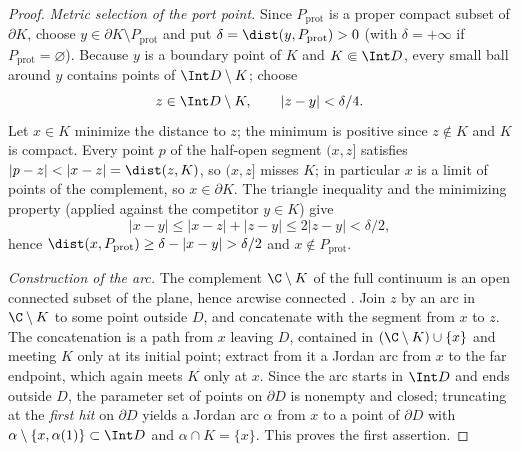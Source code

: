 \begin{proof}
\emph{Metric selection of the port point.}
Since $P_{\mathrm{prot}}$ is a proper compact subset of $\partial K$,
choose $y\in\partial K\setminus P_{\mathrm{prot}}$ and put
$\delta=\dist(y,P_{\mathrm{prot}})>0$ (with $\delta=+\infty$ if
$P_{\mathrm{prot}}=\varnothing$).  Because $y$ is a boundary point of $K$
and $K\Subset\Int D$, every small ball around $y$ contains points of
$\Int D\setminus K$; choose
\[
z\in\Int D\setminus K,\qquad |z-y|<\delta/4 .
\]
Let $x\in K$ minimize the distance to $z$; the minimum is positive since
$z\notin K$ and $K$ is compact.  Every point $p$ of the half-open segment
$(x,z]$ satisfies $|p-z|<|x-z|=\dist(z,K)$, so $(x,z]$ misses $K$; in
particular $x$ is a limit of points of the complement, so
$x\in\partial K$.  The triangle inequality and the minimizing property
(applied against the competitor $y\in K$) give
\[
|x-y|\le|x-z|+|z-y|\le 2|z-y|<\delta/2 ,
\]
hence
$\dist(x,P_{\mathrm{prot}})\ge\delta-|x-y|>\delta/2$ and
$x\notin P_{\mathrm{prot}}$.

\emph{Construction of the arc.}
The complement $\C\setminus K$ of the full continuum is an open connected
subset of the plane, hence arcwise connected \cite{New51}.  Join $z$ by
an arc in $\C\setminus K$ to some point outside $D$, and concatenate
with the segment from $x$ to $z$.  The concatenation is a path from $x$
leaving $D$, contained in $(\C\setminus K)\cup\{x\}$ and meeting $K$ only
at its initial point; extract from it a Jordan arc from $x$ to the far
endpoint, which again meets $K$ only at $x$.  Since the arc starts in
$\Int D$ and ends outside $D$, the parameter set of points on $\partial
D$ is nonempty and closed; truncating at the \emph{first hit} on
$\partial D$ yields a Jordan arc $\alpha$ from $x$ to a point of
$\partial D$ with $\alpha\setminus\{x,\alpha(1)\}\subset\Int D$ and
$\alpha\cap K=\{x\}$.  This proves the first assertion.


\end{proof}
